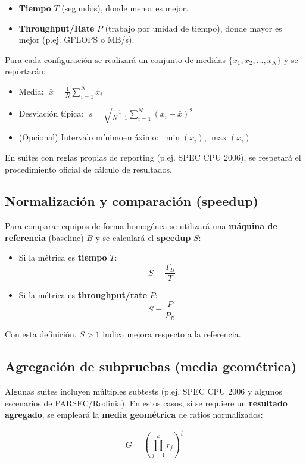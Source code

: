 \documentclass[11pt,a4paper]{article}
\begin{document}
\begin{itemize}
  \item \textbf{Tiempo} $T$ (segundos), donde menor es mejor.
  \item \textbf{Throughput/Rate} $P$ (trabajo por unidad de tiempo), donde mayor es mejor (p.ej. GFLOPS o MB/s).
\end{itemize}

Para cada configuración se realizará un conjunto de medidas $\{x_1, x_2, \dots, x_N\}$ y se reportarán:

\begin{itemize}
  \item Media: $\;\bar{x} = \frac{1}{N}\sum_{i=1}^{N} x_i$
  \item Desviación típica: $\;s = \sqrt{\frac{1}{N-1}\sum_{i=1}^{N}(x_i-\bar{x})^2}$
  \item (Opcional) Intervalo mínimo--máximo: $\;\min(x_i)$, $\max(x_i)$
\end{itemize}

En suites con reglas propias de reporting (p.ej. SPEC CPU 2006), se respetará el procedimiento oficial de cálculo de resultados.

\subsection{Normalización y comparación (speedup)}
Para comparar equipos de forma homogénea se utilizará una \textbf{máquina de referencia} (baseline) $B$ y se calculará el
\textbf{speedup} $S$:

\begin{itemize}
  \item Si la métrica es \textbf{tiempo} $T$:
  \[
    S = \frac{T_B}{T}
  \]
  \item Si la métrica es \textbf{throughput/rate} $P$:
  \[
    S = \frac{P}{P_B}
  \]
\end{itemize}

Con esta definición, $S>1$ indica mejora respecto a la referencia.

\subsection{Agregación de subpruebas (media geométrica)}
Algunas suites incluyen múltiples subtests (p.ej. SPEC CPU 2006 y algunos escenarios de PARSEC/Rodinia).
En estos casos, si se requiere un \textbf{resultado agregado}, se empleará la \textbf{media geométrica} de ratios normalizados:

\[
  G = \left(\prod_{j=1}^{k} r_j\right)^{\frac{1}{k}}
\]
\end{document}
